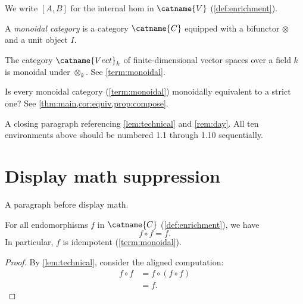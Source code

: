 \documentclass{article}
\numberwithin{equation}{section}
\begin{document}
\begin{notation}\label{not:hom}
We write $[A,B]$ for the internal hom in $\catname{V}$
(\cref{def:enrichment}).
\end{notation}

\begin{terminology}\label{term:monoidal}
A \emph{monoidal category} is a category $\catname{C}$ equipped
with a bifunctor $\otimes$ and a unit object $I$.
\end{terminology}

\begin{example}\label{ex:vect}
The category $\catname{Vect}_k$ of finite-dimensional vector spaces
over a field $k$ is monoidal under $\otimes_k$.
See \cref{term:monoidal}.
\end{example}

\begin{question}\label{q:coherence}
Is every monoidal category (\cref{term:monoidal}) monoidally
equivalent to a strict one?
See \cref{thm:main,cor:equiv,prop:compose}.
\end{question}

A closing paragraph referencing \cref{lem:technical} and \cref{rem:day}.
All ten environments above should be numbered 1.1 through 1.10 sequentially.


\section{Display math suppression}
\label{sec:display}

A paragraph before display math.

\begin{theorem}\label{thm:idempotent}
For all endomorphisms $f$ in $\catname{C}$ (\cref{def:enrichment}), we have
\begin{equation}\label{eq:idem}
  f \circ f = f.
\end{equation}
In particular, $f$ is idempotent (\cref{term:monoidal}).
\end{theorem}

\begin{proof}
By \cref{lem:technical}, consider the aligned computation:
\begin{align}
  f \circ f &= f \circ (f \circ f) \\
            &= f.
\end{align}
\end{proof}
\end{document}
